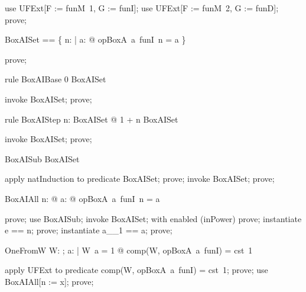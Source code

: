 \documentclass{article}
\begin{document}
\begin{zproof}
use UFExt[F := funM~1, G := funI];
use UFExt[F := funM~2, G := funD];
prove;
\end{zproof}

\begin{zed}
  BoxAISet == \{ n: \nat | \forall a: \nat @ opBoxA~a~funI~n = a \}
\end{zed}

\begin{zproof}
prove;
\end{zproof}

\begin{theorem}{rule BoxAIBase}
  0 \in BoxAISet
\end{theorem}

\begin{zproof}
invoke BoxAISet;
prove;
\end{zproof}

\begin{theorem}{rule BoxAIStep}
  \forall n: BoxAISet @ 1 + n \in BoxAISet
\end{theorem}

\begin{zproof}
invoke BoxAISet;
prove;
\end{zproof}

\begin{theorem}{BoxAISub}
  \nat \subseteq BoxAISet
\end{theorem}

\begin{zproof}
apply natInduction to predicate \nat \subseteq BoxAISet;
prove;
invoke BoxAISet;
prove;
\end{zproof}

\begin{theorem}{BoxAIAll}
  \forall n: \nat @ \forall a: \nat @ opBoxA~a~funI~n = a
\end{theorem}

\begin{zproof}
prove;
use BoxAISub;
invoke BoxAISet;
with enabled (inPower) prove;
instantiate e == n;
prove;
instantiate a\_\_1 == a;
prove;
\end{zproof}

\begin{theorem}{OneFromW}
  \forall W: \nat \fun \nat; a: \nat | W~a = 1 @ comp(W, opBoxA~a~funI) = cst~1
\end{theorem}

\begin{zproof}
apply UFExt to predicate comp(W, opBoxA~a~funI) = cst~1;
prove;
use BoxAIAll[n := x];
prove;
\end{zproof}
\end{document}
